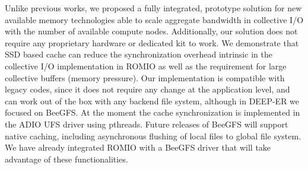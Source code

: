 Unlike previous works, we proposed a fully integrated, prototype solution for new available memory technologies able to scale aggregate bandwidth in collective I/O with the number of available compute 
nodes. Additionally, our solution does not require any proprietary hardware or dedicated kit to work. We demonstrate that SSD based cache can reduce the synchronization overhead intrinsic in the collective 
I/O implementation in ROMIO as well as the requirement for large collective buffers (memory pressure). Our implementation is compatible with legacy codes, since it does not require any change at the application 
level, and can work out of the box with any backend file system, although in DEEP-ER we focused on BeeGFS. At the moment the cache synchronization is implemented in the ADIO UFS driver using pthreads. 
Future releases of BeeGFS will support native caching, including asynchronous flushing of local files to global file system. We have already integrated ROMIO with a BeeGFS driver that will take advantage of 
these functionalities.

